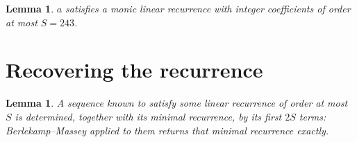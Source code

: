 \documentclass[11pt,a4paper]{article}
\theoremstyle{plain}
\newtheorem{lemma}[theorem]{Lemma}
\theoremstyle{definition}
\begin{document}
\begin{lemma}\label{lem:cf}
$a$ satisfies a monic linear recurrence with integer coefficients of order at most $S=243$.
\end{lemma}

\section{Recovering the recurrence}

\begin{lemma}\label{lem:bm}
A sequence known to satisfy some linear recurrence of order at most $S$ is determined, together
with its minimal recurrence, by its first $2S$ terms: Berlekamp--Massey applied to them returns
that minimal recurrence exactly.
\end{lemma}
\end{document}
